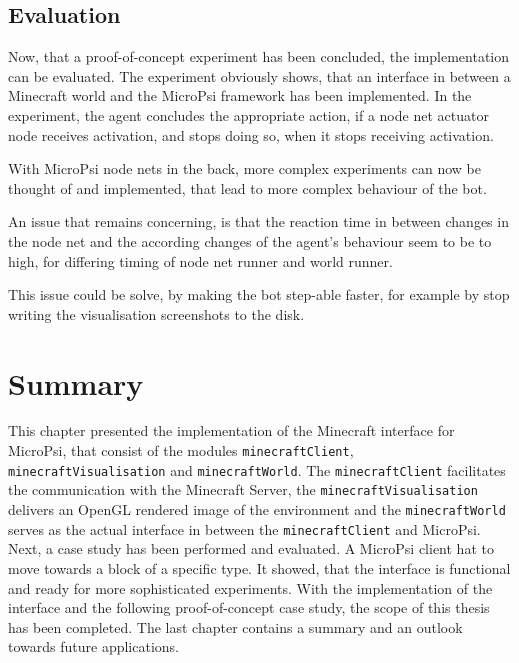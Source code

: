         \subsection{Evaluation}
Now, that a proof-of-concept experiment has been concluded, the implementation can be evaluated.
The experiment obviously shows, that an interface in between a Minecraft world and the MicroPsi framework has been implemented. In the experiment, the agent concludes the appropriate action, if a node net actuator node receives activation, and stops doing so, when it stops receiving activation.

With MicroPsi node nets in the back, more complex experiments can now be thought of and implemented, that lead to more complex behaviour of the bot.

An issue that remains concerning, is that the reaction time in between changes in the node net and the according changes of the agent's behaviour seem to be to high, for differing timing of node net runner and world runner.

This issue could be solve, by making the bot step-able faster, for example by stop writing the visualisation screenshots to the disk.

    \section{Summary}
This chapter presented the implementation of the Minecraft interface for MicroPsi, that consist of the modules \texttt{minecraftClient}, \texttt{minecraftVisualisation} and \texttt{minecraftWorld}. The \texttt{minecraftClient} facilitates the communication with the Minecraft Server, the \texttt{minecraftVisualisation} delivers an OpenGL rendered image of the environment and the \texttt{minecraftWorld} serves as the actual interface in between the \texttt{minecraftClient} and MicroPsi.
Next, a case study has been performed and evaluated. A MicroPsi client hat to move towards a block of a specific type. It showed, that the interface is functional and ready for more sophisticated experiments.
With the implementation of the interface and the following proof-of-concept case study, the scope of this thesis has been completed. The last chapter contains a summary and an outlook towards future applications.
